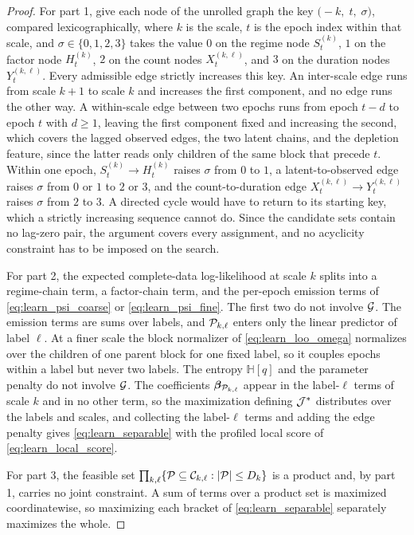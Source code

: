 \begin{proof}
For part 1, give each node of the unrolled graph the key $\big(-k,\; t,\; \sigma\big)$, compared
lexicographically, where $k$ is the scale, $t$ is the epoch index within that scale, and
$\sigma \in \{0,1,2,3\}$ takes the value $0$ on the regime node $S_t^{(k)}$, $1$ on the factor node
$H_t^{(k)}$, $2$ on the count nodes $X_t^{(k,\ell)}$, and $3$ on the duration nodes
$Y_t^{(k,\ell)}$. Every admissible edge strictly increases this key. An inter-scale edge runs from
scale $k+1$ to scale $k$ and increases the first component, and no edge runs the other way. A
within-scale edge between two epochs runs from epoch $t-d$ to epoch $t$ with $d \ge 1$, leaving the
first component fixed and increasing the second, which covers the lagged observed edges, the two
latent chains, and the depletion feature, since the latter reads only children of the same block
that precede $t$. Within one epoch, $S_t^{(k)} \to H_t^{(k)}$ raises $\sigma$ from $0$ to $1$, a
latent-to-observed edge raises $\sigma$ from $0$ or $1$ to $2$ or $3$, and the count-to-duration
edge $X_t^{(k,\ell)} \to Y_t^{(k,\ell)}$ raises $\sigma$ from $2$ to $3$. A directed cycle would
have to return to its starting key, which a strictly increasing sequence cannot do. Since the
candidate sets contain no lag-zero pair, the argument covers every assignment, and no acyclicity
constraint has to be imposed on the search.

For part 2, the expected complete-data log-likelihood at scale $k$ splits into a regime-chain
term, a factor-chain term, and the per-epoch emission terms of \cref{eq:learn_psi_coarse} or
\cref{eq:learn_psi_fine}. The first two do not involve ${\mathcal{G}}$. The emission terms are sums over
labels, and ${\mathcal{P}}_{k,\ell}$ enters only the linear predictor of label $\ell$. At a finer scale the
block normalizer of \cref{eq:learn_loo_omega} normalizes over the children of one parent block
for one fixed label, so it couples epochs within a label but never two labels. The entropy
$\mathbb{H}[q]$ and the parameter penalty do not involve ${\mathcal{G}}$. The coefficients
${\boldsymbol{\beta}}_{{\mathcal{P}}_{k,\ell}}$ appear in the label-$\ell$ terms of scale $k$ and in no other term, so the
maximization defining ${\mathcal{J}}^{\ast}$ distributes over the labels and scales, and collecting the
label-$\ell$ terms and adding the edge penalty gives \cref{eq:learn_separable} with the profiled
local score of \cref{eq:learn_local_score}.

For part 3, the feasible set
$\prod_{k,\ell} \{{\mathcal{P}} \subseteq {\mathcal{C}}_{k,\ell} : |{\mathcal{P}}| \le D_k\}$ is a product and, by part 1,
carries no joint constraint. A sum of terms over a product set is maximized coordinatewise, so
maximizing each bracket of \cref{eq:learn_separable} separately maximizes the whole.
\end{proof}


